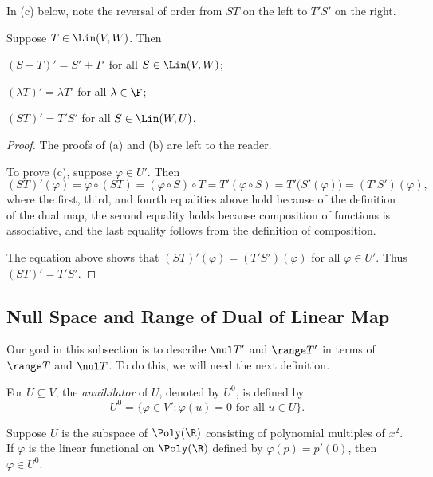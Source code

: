 In (c) below, note the reversal of order from $ST$ on the left to $T'S'$ on the
right.

\begin{result}\label{ax:3.120}
Suppose $T\in\Lin(V,W)$. Then
\begin{parts}
\item $(S+T)'=S'+T'$ for all $S\in\Lin(V,W)$;
\item $(\lambda T)'=\lambda T'$ for all $\lambda\in\F$;
\item $(ST)'=T'S'$ for all $S\in\Lin(W,U)$.
\end{parts}
\end{result}

\begin{proof}
The proofs of (a) and (b) are left to the reader.

To prove (c), suppose $\varphi\in U'$. Then
\[ (ST)'(\varphi) = \varphi\circ(ST) = (\varphi\circ S)\circ T
   = T'(\varphi\circ S) = T'\bigl(S'(\varphi)\bigr) = (T'S')(\varphi), \]
%
where the first, third, and fourth equalities above hold because of the
definition of the dual map, the second equality holds because composition of
functions is associative, and the last equality follows from the definition of
composition.

The equation above shows that $(ST)'(\varphi)=(T'S')(\varphi)$ for all
$\varphi\in U'$. Thus $(ST)'=T'S'$.
\end{proof}

\subsection{Null Space and Range of Dual of Linear Map}

Our goal in this subsection is to describe $\nul T'$ and $\range T'$ in terms of
$\range T$ and $\nul T$. To do this, we will need the next definition.

\begin{definition}[Annihilator, $U^0$]\label{ax:3.121}
For $U\subseteq V$, the \emph{annihilator} of $U$, denoted by $U^0$, is defined
by
\[ U^0 = \{\varphi\in V' : \varphi(u)=0 \text{ for all } u\in U\}. \]
\end{definition}

\begin{example}\label{ax:3.122}
Suppose $U$ is the subspace of $\Poly(\R)$ consisting of polynomial multiples of
$x^2$. If $\varphi$ is the linear functional on $\Poly(\R)$ defined by
$\varphi(p)=p'(0)$, then $\varphi\in U^0$.
\end{example}

